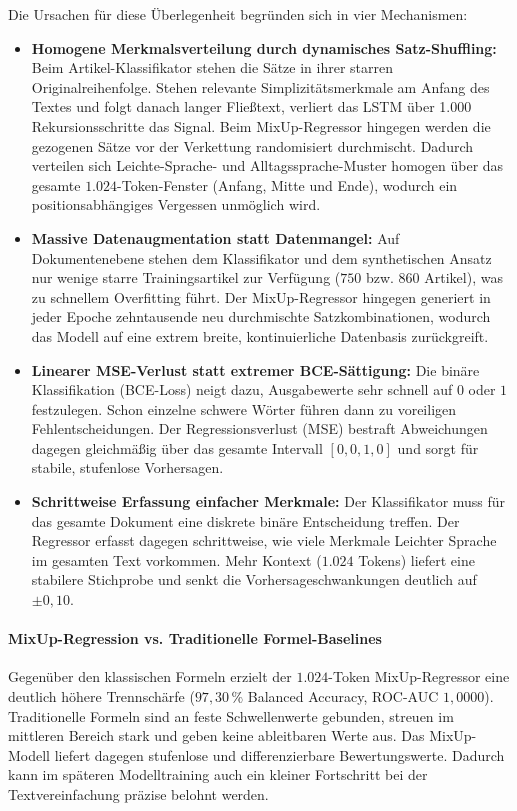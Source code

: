 Die Ursachen für diese Überlegenheit begründen sich in vier Mechanismen:
\begin{itemize}
    \item \textbf{Homogene Merkmalsverteilung durch dynamisches Satz-Shuffling:} Beim Artikel-Klassifikator stehen die Sätze in ihrer starren Originalreihenfolge. Stehen relevante Simplizitätsmerkmale am Anfang des Textes und folgt danach langer Fließtext, verliert das LSTM über 1.000 Rekursionsschritte das Signal. Beim MixUp-Regressor hingegen werden die gezogenen Sätze vor der Verkettung randomisiert durchmischt. Dadurch verteilen sich Leichte-Sprache- und Alltagssprache-Muster homogen über das gesamte $1.024$-Token-Fenster (Anfang, Mitte und Ende), wodurch ein positionsabhängiges Vergessen unmöglich wird.
    \item \textbf{Massive Datenaugmentation statt Datenmangel:} Auf Dokumentenebene stehen dem Klassifikator und dem synthetischen Ansatz nur wenige starre Trainingsartikel zur Verfügung ($750$ bzw. $860$ Artikel), was zu schnellem Overfitting führt. Der MixUp-Regressor hingegen generiert in jeder Epoche zehntausende neu durchmischte Satzkombinationen, wodurch das Modell auf eine extrem breite, kontinuierliche Datenbasis zurückgreift.
    \item \textbf{Linearer MSE-Verlust statt extremer BCE-Sättigung:} Die binäre Klassifikation (BCE-Loss) neigt dazu, Ausgabewerte sehr schnell auf $0$ oder $1$ festzulegen. Schon einzelne schwere Wörter führen dann zu voreiligen Fehlentscheidungen. Der Regressionsverlust (MSE) bestraft Abweichungen dagegen gleichmäßig über das gesamte Intervall $[0{,}0, 1{,}0]$ und sorgt für stabile, stufenlose Vorhersagen.
    \item \textbf{Schrittweise Erfassung einfacher Merkmale:} Der Klassifikator muss für das gesamte Dokument eine diskrete binäre Entscheidung treffen. Der Regressor erfasst dagegen schrittweise, wie viele Merkmale Leichter Sprache im gesamten Text vorkommen. Mehr Kontext ($1.024$ Tokens) liefert eine stabilere Stichprobe und senkt die Vorhersageschwankungen deutlich auf $\pm 0{,}10$.
\end{itemize}

\paragraph{MixUp-Regression vs. Traditionelle Formel-Baselines}
Gegenüber den klassischen Formeln erzielt der $1.024$-Token MixUp-Regressor eine deutlich höhere Trennschärfe ($97{,}30\,\%$ Balanced Accuracy, ROC-AUC $1{,}0000$). Traditionelle Formeln sind an feste Schwellenwerte gebunden, streuen im mittleren Bereich stark und geben keine ableitbaren Werte aus. Das MixUp-Modell liefert dagegen stufenlose und differenzierbare Bewertungswerte. Dadurch kann im späteren Modelltraining auch ein kleiner Fortschritt bei der Textvereinfachung präzise belohnt werden.


